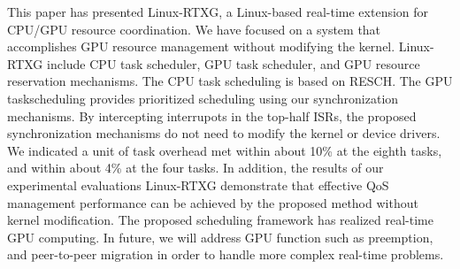 \label{sec:conclusion}
This paper has presented Linux-RTXG, a Linux-based real-time extension for CPU/GPU resource coordination.
We have focused on a system that accomplishes GPU resource management without modifying the kernel.
Linux-RTXG include CPU task scheduler, GPU task scheduler, and GPU resource reservation mechanisms.
The CPU task scheduling is based on RESCH.
The GPU taskscheduling provides prioritized scheduling using our synchronization mechanisms.
By intercepting interrupots in the top-half ISRs, the proposed synchronization mechanisms do not need to modify the kernel or device drivers.
We indicated a unit of task overhead met within about 10\% at the eighth tasks, and within about 4\% at the four tasks.
In addition, the results of our experimental evaluations Linux-RTXG demonstrate that effective QoS management performance can be achieved by the proposed method without kernel modification.
The proposed scheduling framework has realized real-time GPU computing.
In future, we will address GPU function such as preemption, and peer-to-peer migration in order to handle more complex real-time problems.
